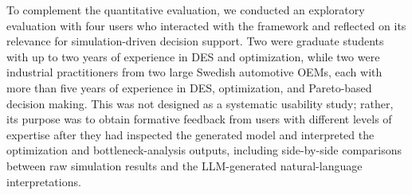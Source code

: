 \documentclass[a4paper,fleqn]{cas-sc}
\begin{document}
  To complement the quantitative evaluation, we conducted an exploratory                                                 
  evaluation with four users who interacted with the framework and
  reflected on its relevance for simulation-driven decision support. Two                                                 
  were graduate students with up to two years of experience in DES and                                                   
  optimization, while two were industrial practitioners from two large                                                   
  Swedish automotive OEMs, each with more than five years of experience                                                  
  in DES, optimization, and Pareto-based decision making. This was not                                                   
  designed as a systematic usability study; rather, its purpose was to                                                   
  obtain formative feedback from users with different levels of expertise                                                
  after they had inspected the generated model and interpreted the                                                       
  optimization and bottleneck-analysis outputs, including side-by-side                                                   
  comparisons between raw simulation results and the LLM-generated                                                       
  natural-language interpretations.                                                                                      
                                                                                                                         
\end{document}
